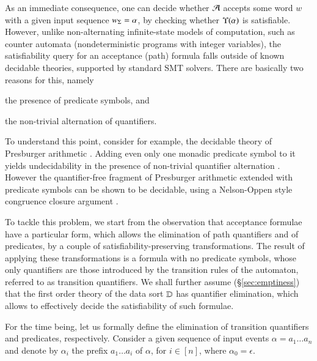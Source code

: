 As an immediate consequence, one can decide whether $\mathcal{A}$ accepts some
word $w$ with a given input sequence ${w}_\Sigma=\alpha$, by checking
whether $\Upsilon({\alpha})$ is satisfiable. However, unlike
non-alternating infinite-state models of computation, such as counter
automata (nondeterministic programs with integer variables), the
satisfiability query for an acceptance (path) formula falls outside of
known decidable theories, supported by standard SMT solvers. There are
basically two reasons for this, namely \begin{inparaenum}[(i)]
\item the presence of predicate symbols, and
\item the non-trivial alternation of quantifiers.
\end{inparaenum}
To understand this point, consider for example, the decidable theory
of Presburger arithmetic \cite{Presburger29}. Adding even only one
monadic predicate symbol to it yields undecidability in the presence
of non-trivial quantifier alternation \cite{Halpern91}. However the
quantifier-free fragment of Presburger arithmetic extended with
predicate symbols can be shown to be decidable, using a Nelson-Oppen
style congruence closure argument \cite{NelsonOppen80}.

To tackle this problem, we start from the observation that acceptance
formulae have a particular form, which allows the elimination of path
quantifiers and of predicates, by a couple of
satisfiability-preserving transformations. The result of applying
these transformations is a formula with no predicate symbols, whose
only quantifiers are those introduced by the transition rules of the
automaton, referred to as transition quantifiers. We shall further
assume (\S\ref{sec:emptiness}) that the first order theory of the data
sort $\mathbb{D}$ has quantifier elimination, which allows to effectively
decide the satisfiability of such formulae.

For the time being, let us formally define the elimination of
transition quantifiers and predicates, respectively. Consider a given
sequence of input events $\alpha = a_1 \ldots a_n$ and denote by
$\alpha_i$ the prefix $a_1 \ldots a_i$ of $\alpha$, for $i \in [n]$,
where $\alpha_0=\epsilon$.

